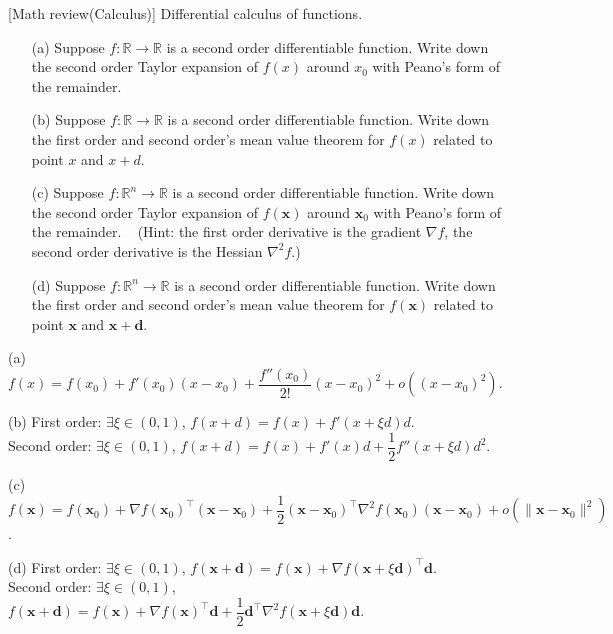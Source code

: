 \item {} [Math review(Calculus)] Differential calculus of functions.

\begin{itemize}
    \item[(a)] Suppose $f: \mathbb{R} \rightarrow \mathbb{R}$ is a second order differentiable function. Write down the second order Taylor expansion of $f(x)$ around $x_0$ with Peano's form of the remainder. ~
    \item[(b)] Suppose $f: \mathbb{R} \rightarrow \mathbb{R}$ is a second order differentiable function. Write down the first order and second order's mean value theorem for $f(x)$ related to point $x$ and $x+d$. ~
    \item[(c)] Suppose $f: \mathbb{R}^n\rightarrow \mathbb{R}$ is a second order differentiable function. Write down the second order Taylor expansion of $f(\mathbf{x})$ around $\mathbf{x}_0$ with Peano's form of the remainder. ~ (Hint: the first order derivative is the gradient $\nabla f$, the second order derivative is the Hessian $\nabla^2 f$.)
    \item[(d)] Suppose $f: \mathbb{R}^n\rightarrow \mathbb{R}$ is a second order differentiable function. Write down the first order and second order's mean value theorem for $f(\mathbf{x})$ related to point $\mathbf{x}$ and $\mathbf{x}+\mathbf{d}$. ~
\end{itemize}

\solution

(a) $f(x) = f(x_0) + f'(x_0)(x-x_0) + \dfrac{f''(x_0)}{2!}(x-x_0)^2 + o((x-x_0)^2)$.

(b) First order: $\exists \xi\in(0,1)$, $f(x+d) = f(x) + f'(x+\xi d)d$. \\
Second order: $\exists \xi\in(0,1)$, $f(x+d) = f(x) + f'(x)d + \dfrac{1}{2}f''(x+\xi d)d^2$.

(c) $f(\mathbf{x}) = f(\mathbf{x}_0) + \nabla f(\mathbf{x}_0)^{\top}(\mathbf{x}-\mathbf{x}_0) + \dfrac{1}{2}(\mathbf{x}-\mathbf{x}_0)^{\top}\nabla^2 f(\mathbf{x}_0)(\mathbf{x}-\mathbf{x}_0) + o(\|\mathbf{x}-\mathbf{x}_0\|^2)$.

(d) First order: $\exists \xi\in(0,1)$, $f(\mathbf{x}+\mathbf{d}) = f(\mathbf{x}) + \nabla f(\mathbf{x}+\xi\mathbf{d})^{\top}\mathbf{d}$. \\
Second order: $\exists \xi\in(0,1)$, $f(\mathbf{x}+\mathbf{d}) = f(\mathbf{x}) + \nabla f(\mathbf{x})^{\top}\mathbf{d} + \dfrac{1}{2}\mathbf{d}^{\top}\nabla^2 f(\mathbf{x}+\xi\mathbf{d})\mathbf{d}$.

\newpage
